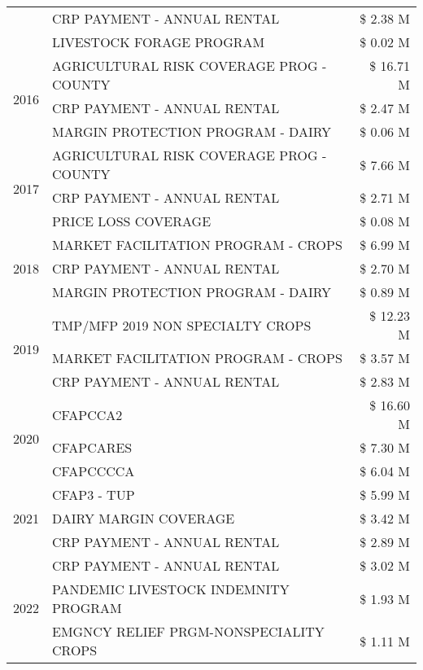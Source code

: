 \begin{tabular}{llr}
 & CRP PAYMENT - ANNUAL RENTAL & \$ 2.38 M \\
 & LIVESTOCK FORAGE PROGRAM & \$ 0.02 M \\
\cline{1-3}
\multirow[t]{3}{*}{2016} & AGRICULTURAL RISK COVERAGE PROG - COUNTY & \$ 16.71 M \\
 & CRP PAYMENT - ANNUAL RENTAL & \$ 2.47 M \\
 & MARGIN PROTECTION PROGRAM - DAIRY & \$ 0.06 M \\
\cline{1-3}
\multirow[t]{3}{*}{2017} & AGRICULTURAL RISK COVERAGE PROG - COUNTY & \$ 7.66 M \\
 & CRP PAYMENT - ANNUAL RENTAL & \$ 2.71 M \\
 & PRICE LOSS COVERAGE & \$ 0.08 M \\
\cline{1-3}
\multirow[t]{3}{*}{2018} & MARKET FACILITATION PROGRAM - CROPS & \$ 6.99 M \\
 & CRP PAYMENT - ANNUAL RENTAL & \$ 2.70 M \\
 & MARGIN PROTECTION PROGRAM - DAIRY & \$ 0.89 M \\
\cline{1-3}
\multirow[t]{3}{*}{2019} & TMP/MFP 2019 NON SPECIALTY CROPS & \$ 12.23 M \\
 & MARKET FACILITATION PROGRAM - CROPS & \$ 3.57 M \\
 & CRP PAYMENT - ANNUAL RENTAL & \$ 2.83 M \\
\cline{1-3}
\multirow[t]{3}{*}{2020} & CFAPCCA2 & \$ 16.60 M \\
 & CFAPCARES & \$ 7.30 M \\
 & CFAPCCCCA & \$ 6.04 M \\
\cline{1-3}
\multirow[t]{3}{*}{2021} & CFAP3 - TUP & \$ 5.99 M \\
 & DAIRY MARGIN COVERAGE & \$ 3.42 M \\
 & CRP PAYMENT - ANNUAL RENTAL & \$ 2.89 M \\
\cline{1-3}
\multirow[t]{3}{*}{2022} & CRP PAYMENT - ANNUAL RENTAL & \$ 3.02 M \\
 & PANDEMIC LIVESTOCK INDEMNITY PROGRAM & \$ 1.93 M \\
 & EMGNCY RELIEF PRGM-NONSPECIALITY CROPS & \$ 1.11 M \\
\cline{1-3}
\bottomrule
\end{tabular}
